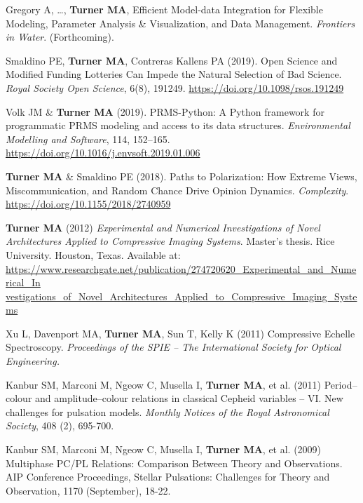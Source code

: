 \documentclass[letterpaper,11pt,oneside]{article}
\begin{document}
\begin{hangparas}{0.25in}{1}
    Gregory A, \ldots, \textbf{Turner MA}, Efficient Model-data Integration for Flexible Modeling, Parameter Analysis \& Visualization, and Data Management. \emph{Frontiers in Water}. (Forthcoming).

    Smaldino PE, \textbf{Turner MA}, Contreras Kallens PA (2019). Open Science and Modified Funding Lotteries Can Impede the Natural Selection of Bad Science. \emph{Royal Society Open Science}, 6(8), 191249. \url{https://doi.org/10.1098/rsos.191249}

    Volk JM \& \textbf{Turner MA} (2019). PRMS-Python: A Python framework for programmatic PRMS modeling and access to its data structures. \emph{Environmental Modelling and Software}, 114, 152–165. \url{https://doi.org/10.1016/j.envsoft.2019.01.006}

    \textbf{Turner MA} \& Smaldino PE (2018). Paths to Polarization: How Extreme Views,
    Miscommunication, and Random Chance Drive Opinion Dynamics. \emph{Complexity}. \url{https://doi.org/10.1155/2018/2740959}

    
  \textbf{Turner MA} (2012) \emph{Experimental and Numerical Investigations of Novel Architectures Applied to Compressive Imaging Systems}. Master's thesis. Rice University. Houston, Texas. Available at: \url{https://www.researchgate.net/publication/274720620_Experimental_and_Numerical_In vestigations_of_Novel_Architectures_Applied_to_Compressive_Imaging_Systems}

    Xu L, Davenport MA, \textbf{Turner MA}, Sun T, Kelly K (2011) Compressive Echelle Spectroscopy. \emph{Proceedings of the SPIE – The International Society for Optical Engineering.}

    Kanbur SM, Marconi M, Ngeow C, Musella I, \textbf{Turner MA}, et al. (2011) Period–colour and amplitude–colour relations in classical Cepheid variables – VI. New challenges for pulsation models. \emph{Monthly Notices of the Royal Astronomical Society}, 408 (2), 695-700.

    Kanbur SM, Marconi M, Ngeow C, Musella I, \textbf{Turner MA}, et al. (2009) Multiphase PC/PL Relations: Comparison Between Theory and Observations. AIP Conference Proceedings, Stellar Pulsations: Challenges for Theory and Observation, 1170 (September), 18-22.
    
  \end{hangparas}
\end{document}
